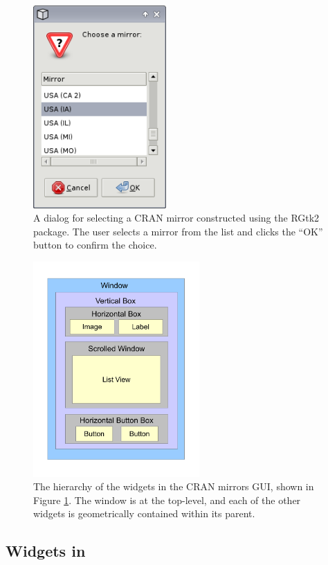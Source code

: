 \documentclass[article]{jss}
\begin{document}
\begin{figure}[bhp]
\begin{center}
\includegraphics[width=2in]{cran-mirror.png}
\caption{\label{fig:cran-mirror}A dialog for selecting a CRAN mirror constructed
using the RGtk2 package. The user selects a mirror from the list and clicks the
``OK'' button to confirm the choice.}
\end{center}
\end{figure}

\begin{figure}[thp]
\begin{center}
\includegraphics[width=2.5in]{widget-hierarchy.pdf}
\caption{\label{fig:widget-hierarchy}The hierarchy of the widgets in the CRAN
mirrors GUI, shown in Figure \ref{fig:cran-mirror}. The window is at the top-level,
and each of the other widgets is geometrically contained within its parent.}
\end{center}
\end{figure}

\subsection[GTK+ Widgets in R]{ Widgets in }
\end{document}
